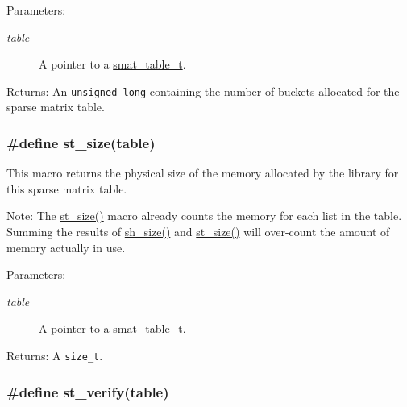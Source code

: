 \begin{Desc}
\item[Parameters:]
\begin{description}
\item[{\em table}]A pointer to a \hyperlink{group__dbprim__smat_a0}{smat\_\-table\_\-t}.\end{description}
\end{Desc}
\begin{Desc}
\item[Returns:]An {\tt unsigned long} containing the number of buckets allocated for the sparse matrix table. \end{Desc}
\hypertarget{group__dbprim__smat_a27}{
\subsubsection[st\_\-size]{\setlength{\rightskip}{0pt plus 5cm}\#define st\_\-size(table)}}
\label{group__dbprim__smat_a27}


This macro returns the physical size of the memory allocated by the library for this sparse matrix table.

\begin{Desc}
\item[Note:]The \hyperlink{group__dbprim__smat_a27}{st\_\-size()} macro already counts the memory for each list in the table. Summing the results of \hyperlink{group__dbprim__smat_a37}{sh\_\-size()} and \hyperlink{group__dbprim__smat_a27}{st\_\-size()} will over-count the amount of memory actually in use.\end{Desc}
\begin{Desc}
\item[Parameters:]
\begin{description}
\item[{\em table}]A pointer to a \hyperlink{group__dbprim__smat_a0}{smat\_\-table\_\-t}.\end{description}
\end{Desc}
\begin{Desc}
\item[Returns:]A {\tt size\_\-t}. \end{Desc}
\hypertarget{group__dbprim__smat_a21}{
\subsubsection[st\_\-verify]{\setlength{\rightskip}{0pt plus 5cm}\#define st\_\-verify(table)}}
\label{group__dbprim__smat_a21}


